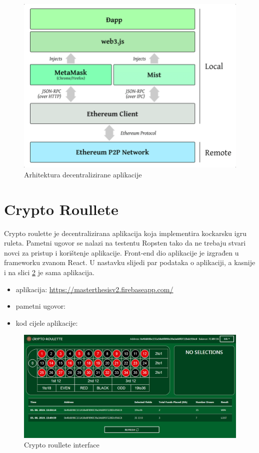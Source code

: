 \documentclass[12pt]{report}
\begin{document}
\begin{figure}[h]
\centering
\includegraphics[scale=0.4]{dapp-architecture}
\caption{Arhitektura decentralizirane aplikacije}
\label{fig:dapp}
\end{figure}

\section{Crypto Roullete}

Crypto roulette je decentralizirana aplikacija koja implementira kockarsku igru ruleta. Pametni ugovor se nalazi na testentu Ropsten tako da ne trebaju stvari novci za pristup i korištenje aplikacije. Front-end dio aplikacije je izgrađen u frameworku zvanom React. U nastavku slijedi par podataka o aplikaciji, a kasnije i na slici \ref{fig:crypto} je sama aplikacija. 

\begin{itemize}
    \item aplikacija: \url{https://masterthesisv2.firebaseapp.com/}
    \item pametni ugovor: \url{}
    \item kod cijele aplikacije:
\end{itemize}

\begin{figure}[h]
\centering
\includegraphics[scale=0.44]{screenshot}
\caption{Crypto roullete interface}
\label{fig:crypto}
\end{figure}
\end{document}
